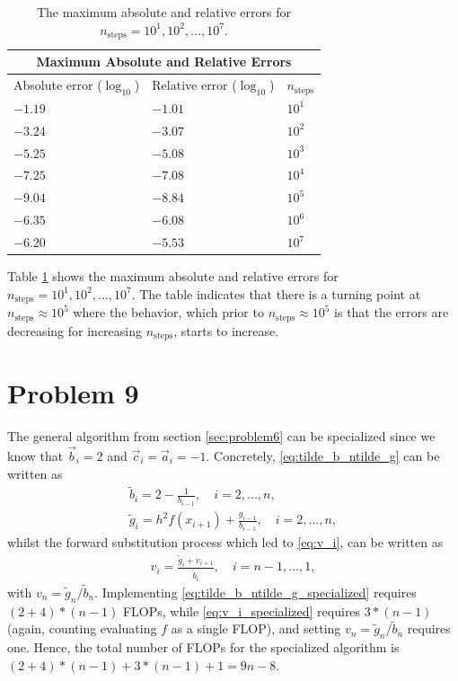 \documentclass[english,notitlepage,reprint,nofootinbib]{revtex4-2}  %
\begin{document}
\begin{table}[h!]
\centering
\begin{tabular}{ |p{3.3cm}|p{3.3cm}|p{1cm}| }
 \hline
 \multicolumn{3}{|c|}{Maximum Absolute and Relative Errors} \\
 \hline
 Absolute error (\(\log_{10}\)) & Relative error (\(\log_{10}\)) & \(n_{\text{steps}}\) \\
 \hline
 \(-1.19\) & \(-1.01\) & \(10^{1}\) \\
 \(-3.24\) & \(-3.07\) & \(10^{2}\) \\
 \(-5.25\) & \(-5.08\) & \(10^{3}\) \\
 \(-7.25\) & \(-7.08\) & \(10^{4}\) \\
 \(-9.04\) & \(-8.84\) & \(10^{5}\) \\
 \(-6.35\) & \(-6.08\) & \(10^{6}\) \\
 \(-6.20\) & \(-5.53\) & \(10^{7}\) \\
 \hline
\end{tabular}
\label{table:errors}
\caption{The maximum absolute and relative errors for \(n_{\text{steps}} = 10^{1}, 10^{2}, ..., 10^{7}\).}
\end{table}
Table \ref{table:errors} shows the maximum absolute and relative errors for \(n_{\text{steps}}= 10^{1}, 10^{2}, ..., 10^{7}\). The table indicates that there is a turning point at \(n_{\text{steps}}\approx 10^{5}\) where the behavior, which prior to \(n_{\text{steps}}\approx 10^{5}\) is that the errors are decreasing for increasing \(n_{\text{steps}}\), starts to increase. 

\section{Problem 9} \label{sec:problem9}
The general algorithm from section \ref{sec:problem6} can be specialized since we know that \(\vec{b}_i=2\) and \(\vec{c}_i = \vec{a}_i=-1\). Concretely, \eqref{eq:tilde_b_ntilde_g} can be written as 
\begin{subequations}    \label{eq:tilde_b_ntilde_g_specialized}
\begin{align}
    \tilde{b}_{i} = 2 - \frac{1}{b_{i-1}}, \quad i=2,..., n,   \label{eq:tilde_b_specialized}\\ 
    \tilde{g}_{i} = h^2f(x_{i+1}) +\frac{g_{i-1}}{b_{i-1}}, \quad i=2,..., n,   \label{eq:tilde_g_specialized}
\end{align}
\end{subequations}
whilst the forward substitution process which led to \eqref{eq:v_i}, can be written as 
\begin{align}
    v_i = \frac{\tilde{g}_{i} + v_{i+1}}{\tilde{b}_{i}}, \quad i = n-1, ..., 1, \label{eq:v_i_specialized}
\end{align}
with \(v_{n} = \tilde{g}_n/\tilde{b}_{n}\). Implementing \eqref{eq:tilde_b_ntilde_g_specialized} requires \({(2+4)*(n-1)}\) FLOPs, while \eqref{eq:v_i_specialized} requires \(3*(n-1)\) (again, counting evaluating \(f\) as a single FLOP), and setting \(v_{n}=\tilde{g}_n/\tilde{b}_n\) requires one. Hence, the total number of FLOPs for the specialized algorithm is \({(2+4)*(n-1) + 3*(n-1) + 1= 9n - 8} \). 
\end{document}
